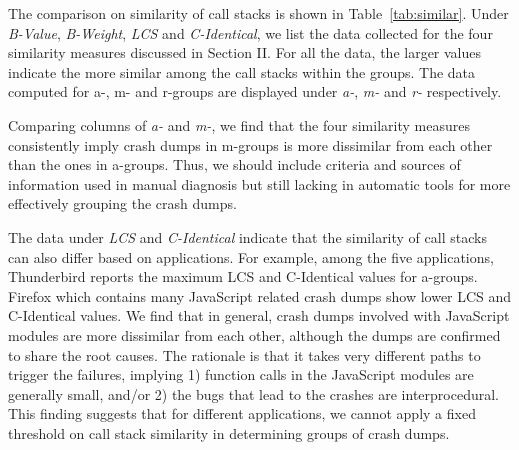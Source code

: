 The comparison on similarity of call stacks is shown in Table~\ref{tab:similar}.  Under {\it B-Value}, {\it B-Weight}, {\it LCS} and {\it C-Identical}, we list the data collected for the four similarity measures discussed in Section II. For all the data, the larger values indicate the more similar among the call stacks within the groups. The data computed for a-, m- and r-groups are displayed under {\it a-}, {\it m-} and {\it r-} respectively.

Comparing columns of {\it a-} and {\it m-}, we find that the four similarity measures consistently imply crash dumps in m-groups is more dissimilar from each other than the ones in a-groups. Thus, we should include criteria and sources of information used in manual diagnosis but still lacking in automatic tools for more effectively grouping the crash dumps. 

The data under {\it LCS} and {\it C-Identical} indicate that the similarity of call stacks can also differ based on  applications. For example, among the five applications, Thunderbird reports the maximum LCS and C-Identical values for a-groups. Firefox which contains many JavaScript related crash dumps show lower LCS and C-Identical values. We find that in general, crash dumps involved with JavaScript modules are more dissimilar from each other, although the dumps are confirmed to share the root causes. The rationale is that it takes very different paths to trigger the failures, implying 1) function calls in the JavaScript modules are generally small, and/or 2) the bugs that lead to the crashes are interprocedural. This finding suggests that for different applications, we cannot apply a fixed threshold on call stack similarity in determining groups of crash dumps.

